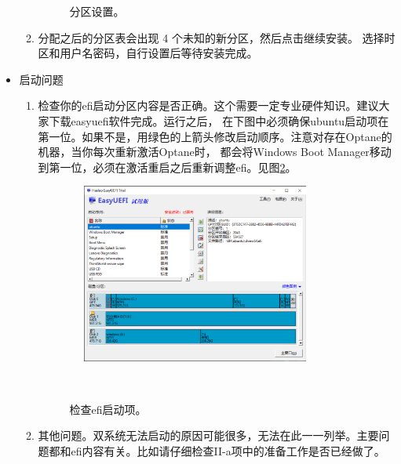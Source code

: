 \begin{itemize}
\begin{enumerate}
\begin{figure}[htbp]
{					}
				    \hfill
                                    \caption{分区设置。}
				    \label{fig:setting}
				\end{figure}
			\item 分配之后的分区表会出现 4 个未知的新分区，然后点击继续安装。
				选择时区和用户名密码，自行设置后等待安装完成。
		\end{enumerate}
	\item 启动问题
		\begin{enumerate}
                        \item 检查你的efi启动分区内容是否正确。这个需要一定专业硬件知识。建议大家下载easyuefi软件完成。运行之后，
                          在下图中必须确保ubuntu启动项在第一位。如果不是，用绿色的上箭头修改启动顺序。注意对存在Optane的机器，当你每次重新激活Optane时，
                          都会将Windows Boot Manager移动到第一位，必须在激活重启之后重新调整efi。见图\ref{fig:uefi}。  
				\begin{figure}[htbp]
					\centering
			　		\includegraphics[width=0.75\textwidth]{png/easyuefi}
			　		\caption{检查efi启动项。}
			　		\label{fig:uefi}
				\end{figure}
                        \item 其他问题。双系统无法启动的原因可能很多，无法在此一一列举。主要问题都和efi内容有关。比如请仔细检查II-a项中的准备工作是否已经做了。
                \end{enumerate}
\end{itemize}


